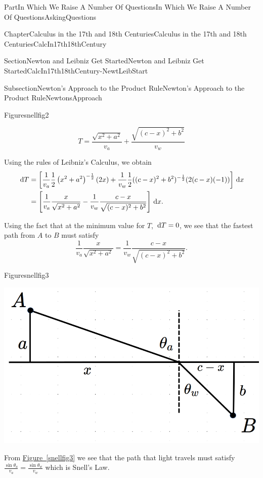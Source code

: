 \documentclass[oneside,10pt,]{book}
\newcommand{\xreffont}{\relax}
\numberwithin{equation}{part}
\newcommand{\dx}[1]{\,{\rm d}#1}
\newcommand{\amp}{&}
\begin{document}
\begin{partptx}{Part}{In Which We Raise A Number Of Questions}{}{In Which We Raise A Number Of Questions}{}{}{AskingQuestions}
\begin{chapterptx}{Chapter}{Calculus in the 17th and 18th Centuries}{}{Calculus in the 17th and 18th Centuries}{}{}{CalcIn17th18thCentury}
\begin{sectionptx}{Section}{Newton and Leibniz Get Started}{}{Newton and Leibniz Get Started}{}{}{CalcIn17th18thCentury-NewtLeibStart}
\begin{subsectionptx}{Subsection}{Newton's Approach to the Product Rule}{}{Newton's Approach to the Product Rule}{}{}{NewtonsApproach}
\begin{figureptx}{Figure}{}{snellfig2}{}
\tcblower
\end{figureptx}%
%
\begin{equation*}
T=\frac{\sqrt{x^2+a^2}}{v_a}+\frac{\sqrt{(c-x)^2+b^2}}{v_w}
\end{equation*}
%
\par
Using the rules of Leibniz's Calculus, we obtain%
\begin{align*}
\dx{ T}\amp = \left[\frac{1}{v_a}\frac{1}{2}\left(x^2+a^2\right)^{-\frac{1}{2}} (2x)+\frac{1}{v_w}\frac{1}{2}((c-x)^2+b^2)^{-\frac{1}{2}}(2(c-x)(-1))\right] \dx{x}\\
\amp =\left[\frac{1}{v_a}\frac{x}{\sqrt{x^2+a^2}}-\frac{1}{v_w}\frac{c-x}{\sqrt{(c-x)^2+b^2}}\right]\dx{ x}\text{.}
\end{align*}
%
\par
Using the fact that at the minimum value for \(T\), \(\dx{
T}=0\), we see that the fastest path from \(A\) to \(B\) must satisfy%
\begin{equation*}
\frac{1}{v_a}\frac{x}{\sqrt{x^2+a^2}}=\frac{1}{v_w}\frac{c-x}{\sqrt{(c-x)^2+b^2}}\text{.}
\end{equation*}
%
\begin{figureptx}{Figure}{}{snellfig3}{}%
\begin{image}{0.225}{0.55}{0.225}{}%
\includegraphics[width=\linewidth]{external/images/snellfig3-1.png}
\end{image}%
\tcblower
\end{figureptx}%
From \hyperref[snellfig3]{Figure~{\xreffont\ref{snellfig3}}} we see that the path that light travels must satisfy \(\frac{\sin\theta_a}{v_a}=\frac{\sin\theta_w}{v_w}\) which is Snell's Law.%
\par

\end{subsectionptx}
\end{sectionptx}
\end{chapterptx}
\end{partptx}
\end{document}
